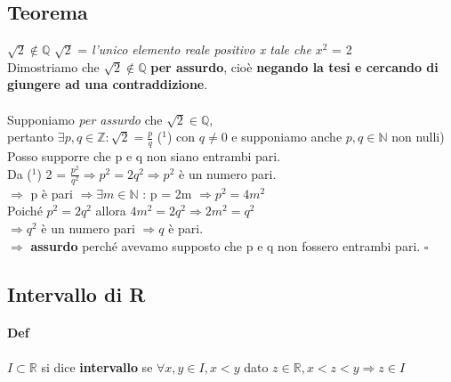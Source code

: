 \documentclass[10pt]{article}
\begin{document}
\subsection{Teorema}  $\sqrt{2} \not\in \mathbb{Q}$
$\sqrt{2}$ = \textit{l'unico elemento reale positivo x tale che} $x^2$ = 2\\
Dimostriamo che $\sqrt{2} \not\in \mathbb{Q}$ \textbf{per assurdo}, cioè \textbf{negando la tesi e cercando di giungere ad una contraddizione}.\\\\
Supponiamo \textit{per assurdo} che $\sqrt{2} \in \mathbb{Q}$,\\
pertanto $\exists p, q \in \mathbb{Z} : \sqrt{2} = \frac{p}{q}$ ($^1$) con $q \neq 0$ e supponiamo anche $p, q \in \mathbb{N}$ non nulli)\\
Posso supporre che p e q non siano entrambi pari.\\
Da ($^1$) 2 = $\frac{p^2}{q^2} \Rightarrow p^2 = 2q^2 \Rightarrow p^2$ è un numero pari.\\
$\Rightarrow$ p è pari $\Rightarrow \exists m \in \mathbb{N}$ : p = 2m $\Rightarrow p^2 = 4m^2$\\
Poiché $p^2 = 2q^2$ allora $4m^2 = 2q^2 \Rightarrow 2m^2 = q^2$\\
$\Rightarrow q^2$ è un numero pari $\Rightarrow q$ è pari.\\
$\Rightarrow$ \textbf{assurdo} perché avevamo supposto che p e q non fossero entrambi pari. $\square$
\subsection{Intervallo di R}
\paragraph{Def} $I \subset \mathbb{R}$ si dice \textbf{intervallo} se $\forall x, y \in I, x < y$ dato $z \in \mathbb{R}, x < z < y \Rightarrow z \in I$
\end{document}
